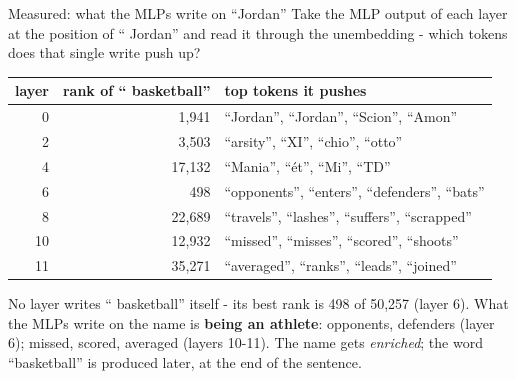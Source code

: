 \documentclass[aspectratio=169]{beamer}
\newcommand{\keybox}[1]{%
  \begin{tcolorbox}[colback=armblue!8, colframe=armblue, boxrule=0.6pt, arc=2pt]
  #1
  \end{tcolorbox}}
\begin{document}
\begin{frame}{Measured: what the MLPs write on ``Jordan''}
  \vspace{0.2em}
  Take the MLP output of each layer at the position of `` Jordan'' and read it through the
  unembedding - which tokens does that single write push up?

  \vspace{0.1em}
  \begin{center}
  \footnotesize
  \begin{tabular}{@{}rrl@{}}
    \toprule
    layer & rank of `` basketball'' & top tokens it pushes\\
    \midrule
    0 & 1,941 & ``Jordan'', ``Jordan'', ``Scion'', ``Amon''\\
    2 & 3,503 & ``arsity'', ``XI'', ``chio'', ``otto''\\
    4 & 17,132 & ``Mania'', ``ét'', ``Mi'', ``TD''\\
    6 & 498 & ``opponents'', ``enters'', ``defenders'', ``bats''\\
    8 & 22,689 & ``travels'', ``lashes'', ``suffers'', ``scrapped''\\
    10 & 12,932 & ``missed'', ``misses'', ``scored'', ``shoots''\\
    11 & 35,271 & ``averaged'', ``ranks'', ``leads'', ``joined''\\
    \bottomrule
  \end{tabular}
  \end{center}

  \vspace{0.3em}
  \keybox{\small No layer writes `` basketball'' itself - its best rank is 498 of 50{,}257 (layer 6).
  What the MLPs write on the name is \textbf{being an athlete}: opponents, defenders (layer 6);
  missed, scored, averaged (layers 10-11). The name gets \emph{enriched}; the word ``basketball''
  is produced later, at the end of the sentence.}
\end{frame}
\end{document}
